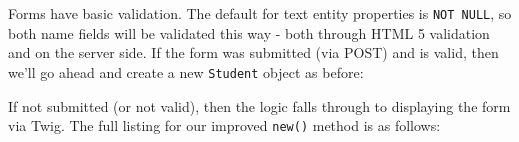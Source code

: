 \documentclass[a4paperpaper,openright]{book}
\newenvironment{Shaded}{}{}
\newcommand{\CommentTok}[1]{\textcolor[rgb]{0.38,0.63,0.69}{\textit{#1}}}
\newcommand{\KeywordTok}[1]{\textcolor[rgb]{0.00,0.44,0.13}{\textbf{#1}}}
\newcommand{\NormalTok}[1]{#1}
\newcommand{\OtherTok}[1]{\textcolor[rgb]{0.00,0.44,0.13}{#1}}
\begin{document}
Forms have basic validation. The default for text entity properties is
\texttt{NOT\ NULL}, so both name fields will be validated this way -
both through HTML 5 validation and on the server side. If the form was
submitted (via POST) and is valid, then we'll go ahead and create a new
\texttt{Student} object as before:

\begin{Shaded}
\end{Shaded}

If not submitted (or not valid), then the logic falls through to
displaying the form via Twig. The full listing for our improved
\texttt{new()} method is as follows:
\end{document}
